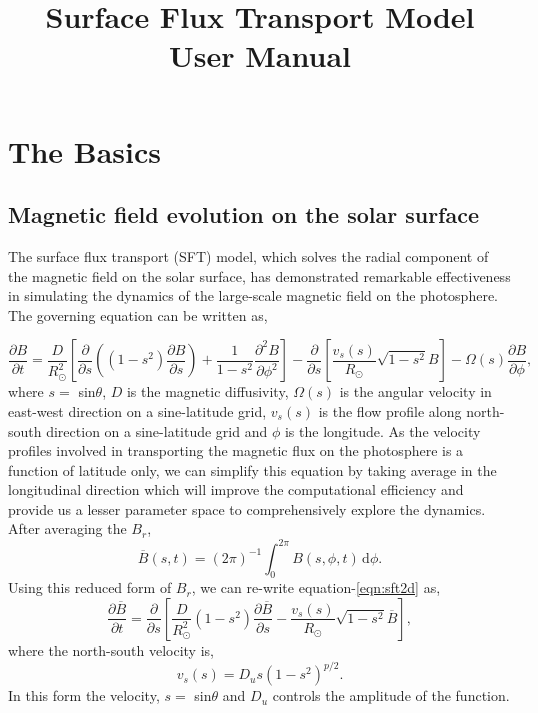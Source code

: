 \documentclass[twoside,12pt]{book}
\title{Surface Flux Transport Model User Manual}
\begin{document}
\maketitle

\chapter{The Basics \label{chapter:basics}}

\section{Magnetic field evolution on the solar surface}


The surface flux transport (SFT) model, which solves the radial component of the magnetic field on the solar surface, has demonstrated remarkable effectiveness in simulating the dynamics of the large-scale magnetic field on the photosphere. The governing equation can be written as,

\begin{equation}
\frac{\partial B}{\partial t} = \frac{D}{R_\odot^2}\left[\frac{\partial}{\partial s}\left((1-s^2)\frac{\partial B}{\partial s}\right) + \frac{1}{1-s^2}\frac{\partial^2B}{\partial\phi^2}\right] - \frac{\partial}{\partial s}\left[\frac{v_s(s)}{R_\odot}\sqrt{1-s^2} B\right]- \Omega(s)\frac{\partial B}{\partial\phi},
\end{equation}
where $s =$ sin$\theta$, $D$ is the magnetic diffusivity, $\Omega (s)$ is the angular velocity in east-west direction on a sine-latitude grid, $v_s (s)$ is the flow profile along north-south direction on a sine-latitude grid and $\phi$ is the longitude. As the velocity profiles involved in transporting the magnetic flux on the photosphere is a function of latitude only, we can simplify this equation by taking average in the longitudinal direction which will improve the computational efficiency and provide us a lesser parameter space to comprehensively explore the dynamics. After averaging the $B_r$, 
\begin{equation}
\overline{B}(s,t)=(2\pi)^{-1}\int_0^{2\pi}B(s,\phi,t)\,\mathrm{d}\phi.
\end{equation}
Using this reduced form of $B_r$, we can re-write equation-\ref{eqn:sft2d} as,
\begin{equation}
\frac{\partial\overline{B}}{\partial t} = \frac{\partial}{\partial s}\left[\frac{D}{R_\odot^2}(1-s^2)\frac{\partial\overline{B}}{\partial s} - \frac{v_s(s)}{R_\odot}\sqrt{1-s^2}\overline{B}\right],
\end{equation}
where the north-south velocity is,
\begin{equation}
v_s(s) = D_us(1-s^2)^{p/2}.
\end{equation}
In this form the velocity, $s =$ sin$\theta$ and $D_u$ controls the amplitude of the function. 
\end{document}
